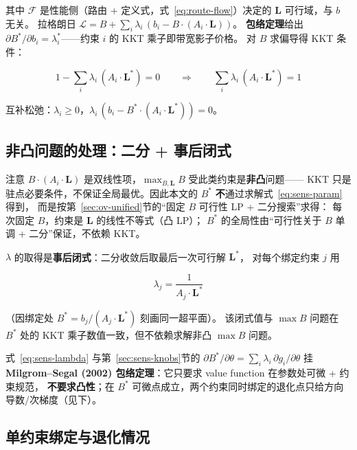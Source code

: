 其中 $\mathcal{F}$ 是性能侧（路由 + 定义式，式~\eqref{eq:route-flow}）决定的 $\mathbf{L}$ 可行域，与 $b$ 无关。
拉格朗日 $\mathcal{L}=B+\sum_i\lambda_i\,(b_i-B\cdot(A_i\cdot\mathbf{L}))$。
\textbf{包络定理}给出 $\partial B^*/\partial b_i=\lambda_i^*$——约束 $i$ 的 KKT 乘子即带宽影子价格。
对 $B$ 求偏导得 KKT 条件：

\begin{equation}\label{eq:sens-kkt}
    1 - \sum_i \lambda_i\,(A_i \cdot \mathbf{L}^*) = 0
    \qquad\Longrightarrow\qquad
    \sum_i \lambda_i\,(A_i \cdot \mathbf{L}^*) = 1
\end{equation}

互补松弛：$\lambda_i\ge 0$，$\lambda_i\,(b_i-B^*\cdot(A_i\cdot\mathbf{L}^*))=0$。

\subsection{非凸问题的处理：二分 + 事后闭式}\label{sec:sens-posthoc}

注意 $B\cdot(A_i\cdot\mathbf{L})$ 是双线性项，$\max_{B,\mathbf{L}}B$ 受此类约束是\textbf{非凸}问题——
KKT 只是驻点必要条件，不保证全局最优。因此本文的 $B^*$ \textbf{不}通过求解式~\eqref{eq:sens-param}得到，
而是按第~\ref{sec:ov-unified}节的``固定 $B$ 可行性 LP + 二分搜索''求得：
每次固定 $B$，约束是 $\mathbf{L}$ 的线性不等式（凸 LP）；
$B^*$ 的全局性由``可行性关于 $B$ 单调 + 二分''保证，不依赖 KKT。

$\lambda$ 的取得是\textbf{事后闭式}：二分收敛后取最后一次可行解 $\mathbf{L}^*$，
对每个绑定约束 $j$ 用

\begin{equation}\label{eq:sens-lambda}
    \lambda_j = \frac{1}{A_j \cdot \mathbf{L}^*}
\end{equation}

（因绑定处 $B^*=b_j/(A_j\cdot\mathbf{L}^*)$ 刻画同一超平面）。
该闭式值与 $\max B$ 问题在 $B^*$ 处的 KKT 乘子数值一致，但不依赖求解非凸 $\max B$ 问题。

式~\eqref{eq:sens-lambda} 与第~\ref{sec:sens-knobs}节的 $\partial B^*/\partial\theta=\sum_i\lambda_i\,\partial g_i/\partial\theta$
挂 \textbf{Milgrom--Segal (2002) 包络定理}：它只要求 value function 在参数处可微 + 约束规范，
\textbf{不要求凸性}；在 $B^*$ 可微点成立，两个约束同时绑定的退化点只给方向导数/次梯度（见下）。

\subsection{单约束绑定与退化情况}\label{sec:sens-degenerate}

